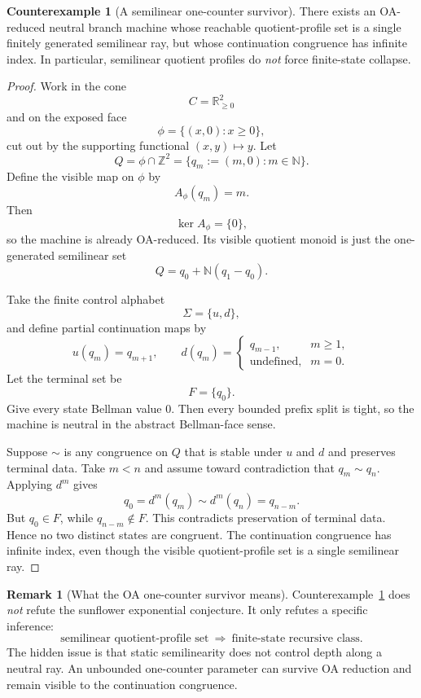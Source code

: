 \documentclass[11pt]{article}
\theoremstyle{definition}
\newtheorem{counterexample}[theorem]{Counterexample}
\newtheorem{remark}[theorem]{Remark}
\newcommand{\N}{\mathbb{N}}
\newcommand{\Z}{\mathbb{Z}}
\newcommand{\R}{\mathbb{R}}
\newcommand{\1}{\mathbf{1}}
\begin{document}
\begin{counterexample}[A semilinear one-counter survivor]\label{ce:oa-one-counter}
There exists an OA-reduced neutral branch machine whose reachable quotient-profile set is a single finitely generated semilinear ray, but whose continuation congruence has infinite index.
In particular, semilinear quotient profiles do \emph{not} force finite-state collapse.
\end{counterexample}

\begin{proof}
Work in the cone
\[
C=\R_{\ge 0}^2
\]
and on the exposed face
\[
\phi=\{(x,0):x\ge 0\},
\]
cut out by the supporting functional $(x,y)\mapsto y$.
Let
\[
Q=\phi\cap \Z^2=\{q_m:=(m,0):m\in \N\}.
\]
Define the visible map on $\phi$ by
\[
A_\phi(q_m)=m.
\]
Then
\[
\ker A_\phi=\{0\},
\]
so the machine is already OA-reduced.
Its visible quotient monoid is just the one-generated semilinear set
\[
Q=q_0+\N(q_1-q_0).
\]

Take the finite control alphabet
\[
\Sigma=\{u,d\},
\]
and define partial continuation maps by
\[
u(q_m)=q_{m+1},
\qquad
d(q_m)=
\begin{cases}
q_{m-1}, & m\ge 1,\\
\text{undefined}, & m=0.
\end{cases}
\]
Let the terminal set be
\[
F=\{q_0\}.
\]
Give every state Bellman value $0$.
Then every bounded prefix split is tight, so the machine is neutral in the abstract Bellman-face sense.

Suppose $\sim$ is any congruence on $Q$ that is stable under $u$ and $d$ and preserves terminal data.
Take $m<n$ and assume toward contradiction that $q_m\sim q_n$.
Applying $d^m$ gives
\[
q_0=d^m(q_m)\sim d^m(q_n)=q_{n-m}.
\]
But $q_0\in F$, while $q_{n-m}\notin F$.
This contradicts preservation of terminal data.
Hence no two distinct states are congruent.
The continuation congruence has infinite index, even though the visible quotient-profile set is a single semilinear ray.
\end{proof}

\begin{remark}[What the OA one-counter survivor means]\label{rem:oa-one-counter}
Counterexample~\ref{ce:oa-one-counter} does \emph{not} refute the sunflower exponential conjecture.
It only refutes a specific inference:
\[
\text{semilinear quotient-profile set}
\ \Longrightarrow\
\text{finite-state recursive class}.
\]
The hidden issue is that static semilinearity does not control depth along a neutral ray.
An unbounded one-counter parameter can survive OA reduction and remain visible to the continuation congruence.
\end{remark}
\end{document}
